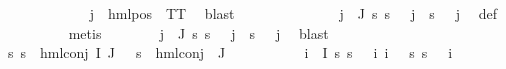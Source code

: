 \begin{isabellebody}
\ \ \ \ \ \ \ \ \ \ \isamarkupfalse%
\ {\isacartoucheopen}{\isasymPsi}\ j\ {\isacharequal}{\kern0pt}\ hml{\isacharunderscore}{\kern0pt}pos\ {\isasymalpha}\ TT{\isacartoucheclose}\ \isamarkupfalse%
\ blast\isanewline
\ \ \ \ \ \ \isamarkupfalse%
\isanewline
\ \ \ \ \ \ \isamarkupfalse%
\ {\isachardoublequoteopen}{\isasymforall}j\ {\isasymin}\ J{\isachardot}{\kern0pt}\ {\isasymforall}s{\isachardot}{\kern0pt}\ s\ {\isasymTurnstile}\ {\isacharparenleft}{\kern0pt}{\isasymPsi}\ j{\isacharparenright}{\kern0pt}\ {\isasymlongleftrightarrow}\ s\ {\isasymTurnstile}\ {\isacharparenleft}{\kern0pt}{\isasymPhi}\ j{\isacharparenright}{\kern0pt}{\isachardoublequoteclose}\ \isamarkupfalse%
\ {\isasymPsi}{\isacharunderscore}{\kern0pt}def\ \isanewline
\ \ \ \ \ \ \ \ \isamarkupfalse%
\ metis\isanewline
\ \ \ \ \ \ \isamarkupfalse%
\ {\isachardoublequoteopen}{\isasymforall}j\ {\isasymin}\ J{\isachardot}{\kern0pt}\ {\isasymforall}s{\isachardot}{\kern0pt}\ {\isasymnot}s\ {\isasymTurnstile}\ {\isacharparenleft}{\kern0pt}{\isasymPsi}\ j{\isacharparenright}{\kern0pt}\ {\isasymlongleftrightarrow}\ {\isasymnot}s\ {\isasymTurnstile}\ {\isacharparenleft}{\kern0pt}{\isasymPhi}\ j{\isacharparenright}{\kern0pt}{\isachardoublequoteclose}\ \isamarkupfalse%
\ blast\isanewline
\ \ \ \ \ \ \isamarkupfalse%
\ {\isachardoublequoteopen}{\isacharparenleft}{\kern0pt}{\isasymforall}s{\isachardot}{\kern0pt}\ {\isacharparenleft}{\kern0pt}s\ {\isasymTurnstile}\ hml{\isacharunderscore}{\kern0pt}conj\ I\ J\ {\isasymPhi}{\isacharparenright}{\kern0pt}\ {\isacharequal}{\kern0pt}\ {\isacharparenleft}{\kern0pt}s\ {\isasymTurnstile}\ hml{\isacharunderscore}{\kern0pt}conj\ {\isacharbraceleft}{\kern0pt}{\isacharbraceright}{\kern0pt}\ J\ {\isasymPsi}{\isacharparenright}{\kern0pt}{\isacharparenright}{\kern0pt}{\isachardoublequoteclose}\isanewline
\ \ \ \ \ \ \ \ \isamarkupfalse%
\ {\isacartoucheopen}{\isasymforall}i\ {\isasymin}\ I{\isachardot}{\kern0pt}\ {\isacharparenleft}{\kern0pt}{\isasymforall}s{\isachardot}{\kern0pt}\ {\isacharparenleft}{\kern0pt}s\ {\isasymTurnstile}\ {\isacharparenleft}{\kern0pt}{\isasymPhi}\ i{\isacharparenright}{\kern0pt}{\isacharparenright}{\kern0pt}{\isacharparenright}{\kern0pt}{\isacartoucheclose}\ {\isacartoucheopen}{\isasymforall}i\ {\isasymin}\ {\isacharbraceleft}{\kern0pt}{\isacharbraceright}{\kern0pt}{\isachardot}{\kern0pt}\ {\isacharparenleft}{\kern0pt}{\isasymforall}s{\isachardot}{\kern0pt}\ {\isacharparenleft}{\kern0pt}s\ {\isasymTurnstile}\ {\isacharparenleft}{\kern0pt}{\isasymPhi}\ i{\isacharparenright}{\kern0pt}{\isacharparenright}{\kern0pt}{\isacharparenright}{\kern0pt}{\isacartoucheclose}\ \isanewline

\end{isabellebody}
